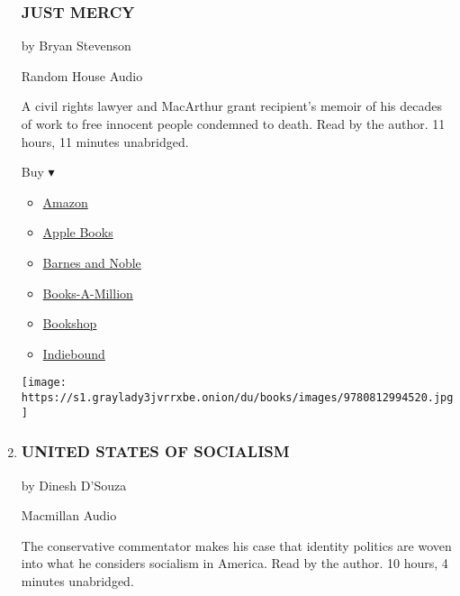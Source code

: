 \begin{enumerate}
{  \subsubsection{JUST MERCY}\label{just-mercy}}

  by Bryan Stevenson

  Random House Audio

  A civil rights lawyer and MacArthur grant recipient's memoir of his
  decades of work to free innocent people condemned to death. Read by
  the author. 11 hours, 11 minutes unabridged.

  Buy ▾

  \begin{itemize}
  \tightlist
  \item
    \href{http://www.amazon.com/Just-Mercy-Story-Justice-Redemption-ebook/dp/B00JYWVYLY?tag=NYTBS-20}{Amazon}
  \item
    \href{https://du-gae-books-dot-nyt-du-prd.appspot.com/buy?title=JUST+MERCY\&author=Bryan+Stevenson}{Apple
    Books}
  \item
    \href{https://www.anrdoezrs.net/click-7990613-11819508?url=https\%3A\%2F\%2Fwww.barnesandnoble.com\%2Fw\%2F\%3Fean\%3D9780553550610}{Barnes
    and Noble}
  \item
    \href{https://www.anrdoezrs.net/click-7990613-35140?url=https\%3A\%2F\%2Fwww.booksamillion.com\%2Fp\%2FJUST\%2BMERCY\%2FBryan\%2BStevenson\%2F9780553550610}{Books-A-Million}
  \item
    \href{https://bookshop.org/a/3546/9780553550610}{Bookshop}
  \item
    \href{https://www.indiebound.org/book/9780553550610?aff=NYT}{Indiebound}
  \end{itemize}

  \texttt{[image: https://s1.graylady3jvrrxbe.onion/du/books/images/9780812994520.jpg]}
\item
  \hypertarget{united-states-of-socialism}{%
  \subsubsection{UNITED STATES OF
  SOCIALISM}\label{united-states-of-socialism}}

  by Dinesh D'Souza

  Macmillan Audio

  The conservative commentator makes his case that identity politics are
  woven into what he considers socialism in America. Read by the author.
  10 hours, 4 minutes unabridged.


\end{enumerate}
